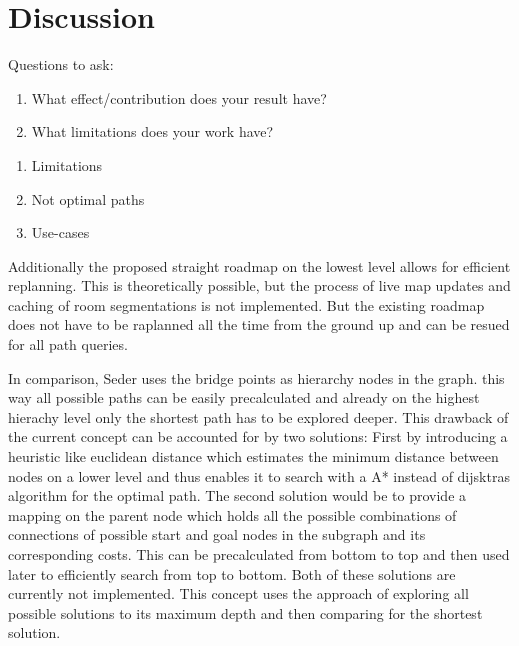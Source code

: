 \chapter{Discussion}
\label{sec:discussion}
Questions to ask:
\begin{enumerate}
    \item What effect/contribution does your result have?
    \item What limitations does your work have?
\end{enumerate}

\begin{enumerate}
    \item Limitations
    \item Not optimal paths
    \item Use-cases
\end{enumerate}

Additionally the proposed straight roadmap on the lowest level allows for efficient replanning. This is theoretically possible, but the process of live map updates and caching of room segmentations is not implemented. But the existing roadmap does not have to be raplanned all the time from the ground up and can be resued for all path queries.

In comparison, Seder \cite{seder_hierarchical_2011} uses the bridge points as hierarchy nodes in the graph. this way all possible paths can be easily precalculated and already on the highest hierachy level only the shortest path has to be explored deeper. This drawback of the current concept can be accounted for by two solutions: First by introducing a heuristic like euclidean distance which estimates the minimum distance between nodes on a lower level and thus enables it to search with a A* instead of dijsktras algorithm for the optimal path. The second solution would be to provide a mapping on the parent node which holds all the possible combinations of connections of possible start and goal nodes in the subgraph and its corresponding costs. This can be precalculated from bottom to top and then used later to efficiently search from top to bottom. Both of these solutions are currently not implemented. This concept uses the approach of exploring all possible solutions to its maximum depth and then comparing for the shortest solution.